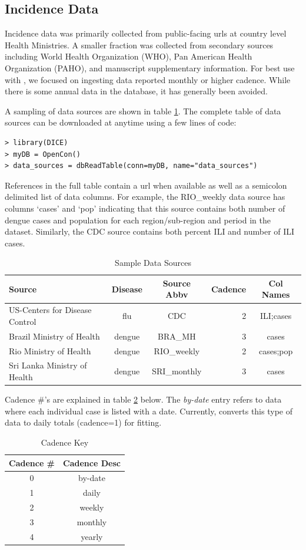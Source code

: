 \documentclass[a4paper]{article}
\begin{document}
\subsection{Incidence Data}
\label{sec:ILIData}
Incidence data was primarily collected from public-facing urls at country level Health Ministries.  A smaller fraction was collected from secondary sources including World Health Organization (WHO), Pan American Health Organization (PAHO), and manuscript supplementary information.  For best use with , we focused on ingesting data reported monthly or higher cadence.  While there is some annual data in the database, it has generally been avoided.

A sampling of data sources are shown in table \ref{tab:data_sources}.  The complete table of data sources can be downloaded at anytime using a few lines of code:
\begin{verbatim}
> library(DICE)
> myDB = OpenCon()
> data_sources = dbReadTable(conn=myDB, name="data_sources")
\end{verbatim}
References in the full table contain a url when available as well as a semicolon delimited list of data columns.  For example, the RIO\_weekly data source has columns `cases' and `pop' indicating that this source contains both number of dengue cases and population for each region/sub-region and period in the dataset.  Similarly, the CDC source contains both percent ILI and number of ILI cases.
\begin{table}[h]
  \caption{Sample Data Sources}
  \centering
  \begin{tabular}{|l|c|c|r|c|}
    \hline
    Source & Disease & Source Abbv & Cadence & Col Names \\ \hline
    US-Centers for Disease Control & flu & CDC & 2 & ILI;cases  \\ \hline
    Brazil Ministry of Health & dengue & BRA\_MH & 3 & cases \\ \hline
    Rio Ministry of Health & dengue & RIO\_weekly & 2 & cases;pop \\ \hline
    Sri Lanka Ministry of Health & dengue & SRI\_monthly & 3 & cases \\ \hline
  \end{tabular} \label{tab:data_sources}
\end{table}
Cadence \#'s are explained in table \ref{tab:cadence} below.  The \textit{by-date} entry refers to data where each individual case is listed with a date.  Currently,  converts this type of data to daily totals (cadence=1) for fitting.
\begin{table}[h]
  \caption{Cadence Key}
  \centering
  \begin{tabular}{|c|c|}
    \hline
    Cadence \# & Cadence Desc \\ \hline
    0 & by-date \\ \hline
    1 & daily  \\ \hline
    2 & weekly \\ \hline
    3 & monthly \\ \hline
    4 & yearly \\ \hline
  \end{tabular} \label{tab:cadence}
\end{table}
\end{document}
